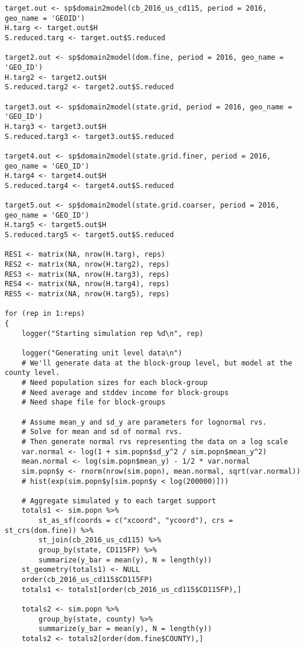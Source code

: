 \documentclass[12pt]{article}
\begin{document}
\begin{footnotesize}
\begin{verbatim}
target.out <- sp$domain2model(cb_2016_us_cd115, period = 2016, geo_name = 'GEOID')
H.targ <- target.out$H
S.reduced.targ <- target.out$S.reduced

target2.out <- sp$domain2model(dom.fine, period = 2016, geo_name = 'GEO_ID')
H.targ2 <- target2.out$H
S.reduced.targ2 <- target2.out$S.reduced

target3.out <- sp$domain2model(state.grid, period = 2016, geo_name = 'GEO_ID')
H.targ3 <- target3.out$H
S.reduced.targ3 <- target3.out$S.reduced

target4.out <- sp$domain2model(state.grid.finer, period = 2016, geo_name = 'GEO_ID')
H.targ4 <- target4.out$H
S.reduced.targ4 <- target4.out$S.reduced

target5.out <- sp$domain2model(state.grid.coarser, period = 2016, geo_name = 'GEO_ID')
H.targ5 <- target5.out$H
S.reduced.targ5 <- target5.out$S.reduced

RES1 <- matrix(NA, nrow(H.targ), reps)
RES2 <- matrix(NA, nrow(H.targ2), reps)
RES3 <- matrix(NA, nrow(H.targ3), reps)
RES4 <- matrix(NA, nrow(H.targ4), reps)
RES5 <- matrix(NA, nrow(H.targ5), reps)

for (rep in 1:reps)
{
    logger("Starting simulation rep %d\n", rep)

    logger("Generating unit level data\n")
    # We'll generate data at the block-group level, but model at the county level.
    # Need population sizes for each block-group
    # Need average and stddev income for block-groups
    # Need shape file for block-groups

    # Assume mean_y and sd_y are parameters for lognormal rvs.
    # Solve for mean and sd of normal rvs.
    # Then generate normal rvs representing the data on a log scale
    var.normal <- log(1 + sim.popn$sd_y^2 / sim.popn$mean_y^2)
    mean.normal <- log(sim.popn$mean_y) - 1/2 * var.normal
    sim.popn$y <- rnorm(nrow(sim.popn), mean.normal, sqrt(var.normal))
    # hist(exp(sim.popn$y[sim.popn$y < log(200000)]))

    # Aggregate simulated y to each target support
    totals1 <- sim.popn %>%
        st_as_sf(coords = c("xcoord", "ycoord"), crs = st_crs(dom.fine)) %>%
        st_join(cb_2016_us_cd115) %>%
        group_by(state, CD115FP) %>%
        summarize(y_bar = mean(y), N = length(y))
    st_geometry(totals1) <- NULL
    order(cb_2016_us_cd115$CD115FP)
    totals1 <- totals1[order(cb_2016_us_cd115$CD115FP),]

    totals2 <- sim.popn %>%
        group_by(state, county) %>%
        summarize(y_bar = mean(y), N = length(y))
    totals2 <- totals2[order(dom.fine$COUNTY),]


\end{verbatim}
\end{footnotesize}
\end{document}
